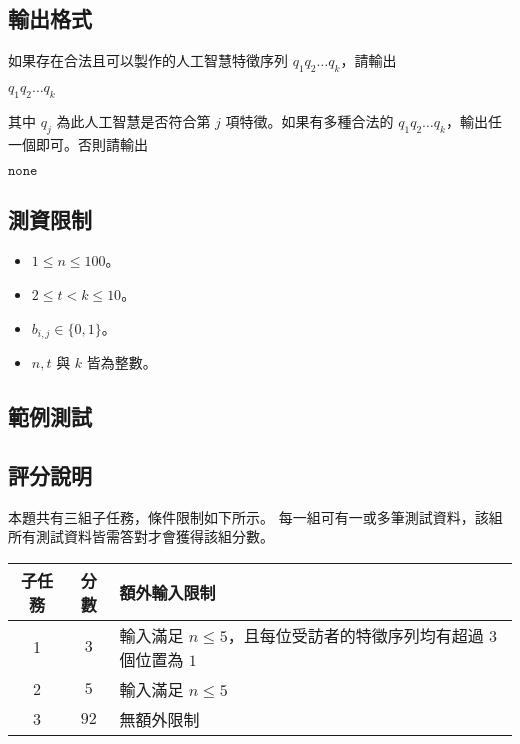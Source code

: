 \subsection{輸出格式}

如果存在合法且可以製作的人工智慧特徵序列 \(q_1q_2\ldots q_k\)，請輸出

\begin{format}
\f{
$q_1q_2\ldots q_k$
}
\end{format}

\noindent 其中 \(q_j\) 為此人工智慧是否符合第 \(j\)
項特徵。如果有多種合法的
\(q_1q_2\ldots q_k\)，輸出任一個即可。否則請輸出

\begin{format}
\f{
$\texttt{none}$
}
\end{format}

\subsection{測資限制}

\begin{itemize}
\tightlist
\item
  \(1 \le n \le 100\)。
\item
  \(2 \le t< k \le 10\)。
\item
  \(b_{i, j}\in \{0,1\}\)。
\item
  \(n, t\) 與 \(k\) 皆為整數。
\end{itemize}

\subsection{範例測試}

\begin{example}
%
%
\end{example}

\subsection{評分說明}

本題共有三組子任務，條件限制如下所示。
每一組可有一或多筆測試資料，該組所有測試資料皆需答對才會獲得該組分數。

\begin{longtable}[]{@{}ccl@{}}
\toprule
子任務 & 分數 & 額外輸入限制 \\
\midrule
\endhead
1 & \(3\) & 輸入滿足 \(n\leq 5\)，且每位受訪者的特徵序列均有超過 \(3\)
個位置為 \(1\) \\
2 & \(5\) & 輸入滿足 \(n\leq 5\) \\
3 & \(92\) & 無額外限制 \\
\bottomrule
\end{longtable}

